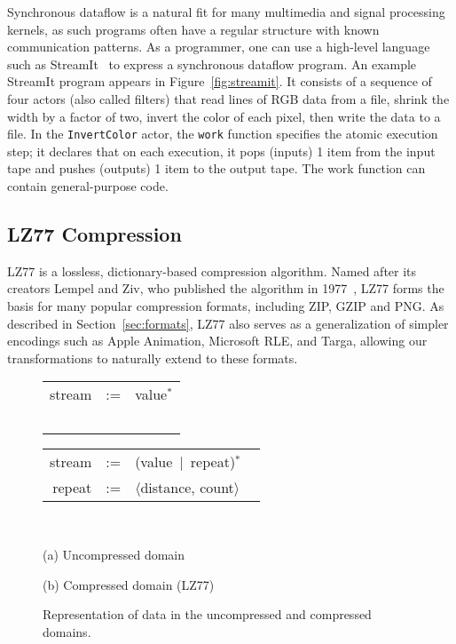 Synchronous dataflow is a natural fit for many multimedia and signal
processing kernels, as such programs often have a regular structure
with known communication patterns.  As a programmer, one can use a
high-level language such as StreamIt~\cite{streamitcc} to express a
synchronous dataflow program.  An example StreamIt program appears in
Figure~\ref{fig:streamit}.  It consists of a sequence of four actors
(also called filters) that read lines of RGB data from a file,
shrink the width by a factor of two, invert the color of each pixel,
then write the data to a file.  In the {\tt InvertColor} actor, the
{\tt work} function specifies the atomic execution step; it declares
that on each execution, it pops (inputs) 1 item from the input tape
and pushes (outputs) 1 item to the output tape.  The work function can
contain general-purpose code.

\subsection{LZ77 Compression}

LZ77 is a lossless, dictionary-based compression algorithm.  Named
after its creators Lempel and Ziv, who published the algorithm in
1977~\cite{lz77}, LZ77 forms the basis for many popular compression
formats, including ZIP, GZIP and PNG.  As described in
Section~\ref{sec:formats}, LZ77 also serves as a generalization of
simpler encodings such as Apple Animation, Microsoft RLE, and Targa,
allowing our transformations to naturally extend to these formats.

\begin{figure}[t]
\begin{minipage}{1.6in}
\hspace{-5pt}\begin{tabular}{rcl}
stream&\hspace{-9pt}:=&\hspace{-9pt}value$^*$\\ ~ & ~
\end{tabular}
\end{minipage}
\begin{minipage}{1.8in}
\hspace{-5pt}\begin{tabular}{rcl}
stream&\hspace{-9pt}:=&\hspace{-9pt}(value~$|$~repeat)$^*$ ~ \\
repeat&\hspace{-9pt}:=&\hspace{-9pt}$\langle$distance, count$\rangle$
\end{tabular}
\end{minipage} 
~ \\
\begin{minipage}{1.6in}
(a) Uncompressed domain
\end{minipage}
(b) Compressed domain (LZ77)
\caption{Representation of data in the uncompressed and compressed
domains.  \protect\label{fig:domains}}
\end{figure}

